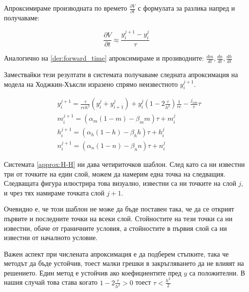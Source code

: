 \documentclass{article}
\numberwithin{equation}{section}
\begin{document}
    Апроксимираме производната по времето $\frac{\partial V}{\partial t}$ с формулата за разлика напред и получаваме:

    \begin{equation}\label{der:forward_time}
        \frac{\partial V}{\partial t} \approx \frac{y_i^{j+1} - y_i^j}{\tau}
    \end{equation}

    Аналогично на \eqref{der:forward_time} апроксимираме и прозиводните: $\frac{dm}{dt}, \frac{dn}{dt}, \frac{dh}{dt}$

    Замествайки тези резултати в системата получаваме следната апроксимация на модела на Ходжкин-Хъксли изразено спрямо неизвестното
    $y_i^{j+1}$.

    \begin{equation}\label{approx:H-H}
        \begin{aligned}
            &y_i^{j+1} = \frac{\tau}{rch^2}\left(y_i^j +y_{i+1}^j\right) + y_i^j\left(1 - 2\frac{\tau}{h^2}\right)\frac{1}{rc}
            - \frac{j_{ion}}{c}\tau\\
            &m_i^{j+1} = \left(\alpha_m(1-m) - \beta_mm\right)\tau + m_i^j\\
            &h_i^{j+1} = \left(\alpha_h(1-h) - \beta_hh\right)\tau + h_i^j\\
            &n_i^{j+1} = \left(\alpha_n(1-n) - \beta_nn\right)\tau + n_i^j
    \end{aligned}
    \end{equation}

    Системата \eqref{approx:H-H} ни дава четириточков шаблон. След като са ни известни три от точките на един слой, можем да намерим една точка
    на следващия. Следващата фигура илюстрира това визуално, известни са ни точките на слой $j$, и чрез тях намираме точката слой $j+1$.
    \begin{figure}[h!]
        \begin{center}
        
        \caption{}
        \end{center}
    \end{figure}

    Очевидно е, че този шаблон не може да бъде поставен така, че да се открият първите и последните точки на всеки слой. Стойностите на тези
    точки са ни известни, обаче от граничните условия, а стойностите в първия слой са ни известни от началното условие.

    Важен аспект при числената апроксимация е да подберем стъпките, така че методът да бъде устойчив, тоест малки грешки в закръгляването да
    не влияят на решението. Един метод е устойчив ако коефициентите пред $y$ са положителни. В нашия случай това става когато $1 -
    2\frac{\tau}{h^2} > 0$ тоест $\tau < \frac{h^2}{2}$
\end{document}
